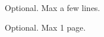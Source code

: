 \begin{dedication}
	Optional. Max a few lines.
\end{dedication}

\begin{acknowledgements}
	Optional. Max 1 page.
\end{acknowledgements}
